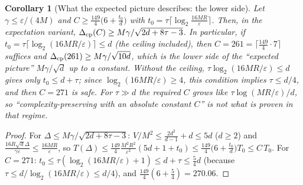 \documentclass[11pt,a4paper]{article}
\numberwithin{equation}{section}
\newtheorem{corollary}[theorem]{Corollary}
\theoremstyle{definition}
\theoremstyle{remark}
\begin{document}
\begin{corollary}[What the expected picture describes: the lower side]\label{cor:cp}
Let $\gamma\le\varepsilon/(4M)$ and $C\ge\frac{149}4\big(6+\frac{t_0}d\big)$ with $t_0=\tau\lceil\log_2\frac{16MR}{\varepsilon}\rceil$. Then, in the expectation variant, $\Delta_{\rm cp}(C)\ge M\gamma/\sqrt{2d+8\tau-3}$. In particular, if $t_0=\tau\lceil\log_2(16MR/\varepsilon)\rceil\le d$ (the ceiling included), then $C=261=\lceil\frac{149}4\cdot7\rceil$ suffices and $\Delta_{\rm cp}(261)\ge M\gamma/\sqrt{10d}$, which is the lower side of the ``expected picture'' $M\gamma/\sqrt d$ up to a constant. Without the ceiling, $\tau\log_2(16MR/\varepsilon)\le d$ gives only $t_0\le d+\tau$; since $\log_2(16MR/\varepsilon)\ge4$, this condition implies $\tau\le d/4$, and then $C=271$ is safe. For $\tau\gg d$ the required $C$ grows like $\tau\log(MR/\varepsilon)/d$, so ``complexity-preserving with an absolute constant $C$'' is \emph{not} what is proven in that regime.
\end{corollary}
\begin{proof}
For $\Delta\le M\gamma/\sqrt{2d+8\tau-3}$: $V/M^2\le\frac{2d^2}{d-1}+d\le5d$ ($d\ge2$) and $\frac{16R\sqrt d\Delta}{\gamma\varepsilon}\le\frac{16MR}\varepsilon$, so $T(\Delta)\le\frac{149}4\frac{M^2R^2}{\varepsilon^2}(5d+1+t_0)\le\frac{149}4\big(6+\frac{t_0}d\big)T_0\le C\,T_0$. For $C=271$: $t_0\le\tau(\log_2(16MR/\varepsilon)+1)\le d+\tau\le\frac54d$ (because $\tau\le d/\log_2(16MR/\varepsilon)\le d/4$), and $\frac{149}4(6+\frac54)=270.06$.
\end{proof}
\end{document}
